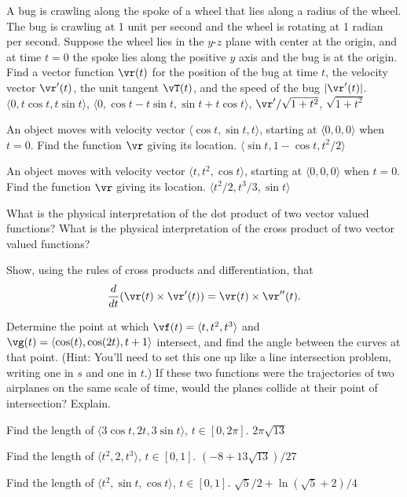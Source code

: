 \begin{multicols}{2}
\problem A bug is crawling along the spoke of a wheel that lies along %
a radius of the wheel. The bug is crawling at 1 unit per second and
the wheel is rotating at 1 radian per second. Suppose the wheel lies
in the $y$-$z$ plane with center at the origin, and at time $t=0$ the
spoke lies along the positive $y$ axis and the bug is at the origin. 
Find a vector function $\vr (t)$
for the position of the bug at time $t$, the velocity vector
$\vr '(t)$, the unit tangent ${\vT}(t)$, and the speed of the bug
$|\vr '(t)|$.
\answer
$\langle 0,t\cos t,t\sin t\rangle$, 
$\langle 0,\cos t-t\sin t,\sin t+t\cos t\rangle$,
$\vr '/\sqrt{1+t^2}$, $\sqrt{1+t^2}$
\endanswer

\problem An object moves with velocity vector $\langle \cos t, \sin t, %
t\rangle$, starting at $\langle 0,0,0\rangle$ when $t=0$. Find the function
$\vr $ giving its location.
\answer
$\langle \sin t,1-\cos t,t^2/2\rangle$
\endanswer

\problem An object moves with velocity vector $\langle t, t^2, %
\cos t\rangle$, starting at $\langle 0,0,0\rangle$ when $t=0$.
Find the function
$\vr $ giving its location.
\answer
$\langle t^2/2,t^3/3,\sin t\rangle$
\endanswer

\problem What is the physical interpretation of the dot product of two %
vector valued functions?  What is the physical interpretation of the
cross product of two vector valued functions?

\problem Show, using the rules of cross products and differentiation, %
that
$${d\over dt} (\vr (t) \times \vr '(t))= 
\vr (t) \times \vr ''(t).$$

\problem Determine the point at which ${\vf}(t)=\langle t, t^2, t^3 %
\rangle$ and ${\vg}(t) =\langle \cos(t), \cos(2t), t+1 \rangle$
intersect, and find the angle between the curves at that point.  (Hint:
You'll need to set this one up like a line intersection problem,
writing one in $s$ and one in $t$.) If these two functions were the
trajectories of two airplanes on the same scale of time, would the
planes collide at their point of intersection?  Explain.




\problem Find the length of $\langle 3\cos t,2t,3\sin t\rangle$,  %
$t\in[0,2\pi]$.
\answer
$2\pi\sqrt{13}$
\endanswer

\problem Find the length of $\langle t^2,2,t^3\rangle$, $t\in[0,1]$. %
\answer
$(-8+13\sqrt{13})/27$
\endanswer

\problem Find the length of $\langle t^2,\sin t,\cos t\rangle$, $t\in[0,1]$. %
\answer
$\sqrt5/2+\ln(\sqrt5+2)/4$
\endanswer


\end{multicols}
